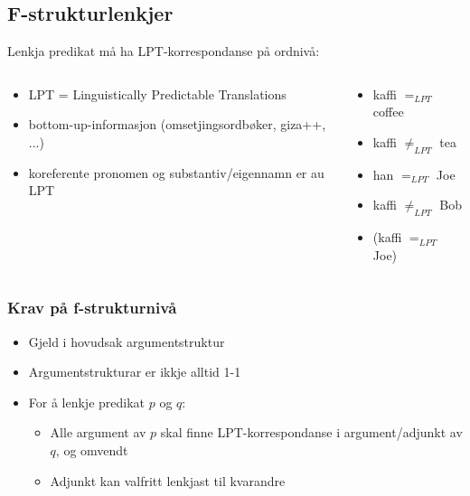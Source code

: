 \documentclass[xcolor=x11names,compress,bigger]{beamer}
\renewcommand{\(}{\begin{columns}}
\renewcommand{\)}{\end{columns}}
\newcommand{\<}[1]{\begin{column}{#1}}
\renewcommand{\>}{\end{column}}
\begin{document}
\subsection{F-strukturlenkjer}
\begin{frame}
  Lenkja predikat må ha LPT-korrespondanse på ordnivå:
  \begin{columns}
    \begin{column}{0.5\textwidth}
      \begin{itemize}
      \item LPT = Linguistically Predictable Translations
      \item bottom-up-informasjon (omsetjingsordbøker, giza++, ...)
      \item koreferente pronomen og substantiv/eigennamn er au LPT
      \end{itemize}
    \end{column}

    \begin{column}{0.5\textwidth}
      \begin{itemize}
      \item kaffi $=_{LPT}$ coffee
      \item kaffi $\neq_{LPT}$ tea
      \item han $=_{LPT}$ Joe
      \item kaffi $\neq_{LPT}$ Bob
      \item (kaffi $=_{LPT}$ Joe)
      \end{itemize}
    \end{column}
  \end{columns}
\end{frame}


\begin{frame}\frametitle{Krav på f-strukturnivå}
  \begin{itemize}
  \item Gjeld i hovudsak argumentstruktur
  

  \item Argumentstrukturar er ikkje alltid 1-1
  
  \item For å lenkje predikat $p$ og $q$:
    \begin{itemize}
    \item Alle argument av $p$ skal finne LPT-korrespondanse i
      argument/adjunkt av $q$, og omvendt
    \item Adjunkt kan valfritt lenkjast til kvarandre
    \end{itemize}
  \end{itemize}
\end{frame}
\end{document}
